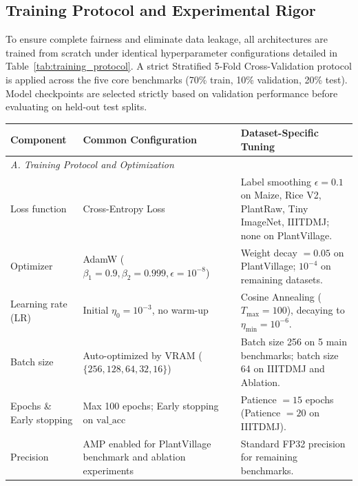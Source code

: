 \documentclass[]{interact}
\theoremstyle{plain}
\theoremstyle{definition}
\theoremstyle{remark}
\begin{document}
{\subsection{Training Protocol and Experimental Rigor}
\label{subsec:training-protocol}

To ensure complete fairness and eliminate data leakage, all architectures are trained from scratch under identical hyperparameter configurations detailed in Table~\ref{tab:training_protocol}. A strict Stratified 5-Fold Cross-Validation protocol is applied across the five core benchmarks (70\% train, 10\% validation, 20\% test). Model checkpoints are selected strictly based on validation performance before evaluating on held-out test splits.

\begin{table}[H]
\footnotesize
\setlength{\tabcolsep}{3.5pt}
\renewcommand{\arraystretch}{1.10}
{\begin{tabular}{@{}p{3.1cm}p{5.4cm}p{5.7cm}@{}} \toprule
\textbf{Component} & \textbf{Common Configuration} & \textbf{Dataset-Specific Tuning} \\ \midrule
\multicolumn{3}{l}{\textit{A. Training Protocol and Optimization}} \\ \midrule
Loss function & Cross-Entropy Loss & Label smoothing $\epsilon = 0.1$ on Maize, Rice V2, PlantRaw, Tiny ImageNet, IIITDMJ; none on PlantVillage. \\
Optimizer & AdamW ($\beta_1 = 0.9, \beta_2 = 0.999, \epsilon = 10^{-8}$) & Weight decay $= 0.05$ on PlantVillage; $10^{-4}$ on remaining datasets. \\
Learning rate (LR) & Initial $\eta_0 = 10^{-3}$, no warm-up & Cosine Annealing ($T_{\max} = 100$), decaying to $\eta_{\min} = 10^{-6}$. \\
Batch size & Auto-optimized by VRAM ($\{256, 128, 64, 32, 16\}$) & Batch size 256 on 5 main benchmarks; batch size 64 on IIITDMJ and Ablation. \\
Epochs \& Early stopping & Max 100 epochs; Early stopping on $\text{val\_acc}$ & Patience $= 15$ epochs (Patience $= 20$ on IIITDMJ). \\
Precision & AMP enabled for PlantVillage benchmark and ablation experiments & Standard FP32 precision for remaining benchmarks. \\ \bottomrule
\end{tabular}}
\end{table}

}
\end{document}
